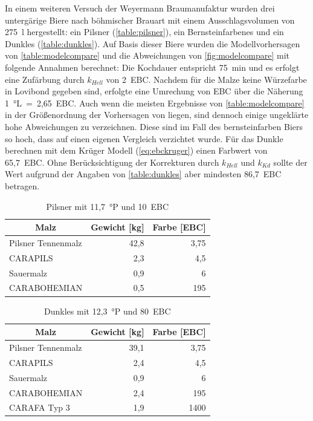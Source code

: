 \documentclass[a4paper,parskip=half]{scrartcl}
\newcommand{\khell}{k_{Hell}}
\newcommand{\kkd}{k_{Kd}}
\begin{document}
In einem weiteren Versuch der Weyermann Braumanufaktur wurden drei untergärige Biere nach böhmischer Brauart mit einem Ausschlagsvolumen von 275~l hergestellt: ein Pilsner (\autoref{table:pilsner}), ein Bernsteinfarbenes und ein Dunkles (\autoref{table:dunkles}). Auf Basis dieser Biere wurden die Modellvorhersagen von \autoref{table:modelcompare} und die Abweichungen von \autoref{fig:modelcompare} mit folgende Annahmen berechnet: Die Kochdauer entspricht 75~min und es erfolgt eine Zufärbung durch $\khell$ von 2~EBC. Nachdem für die Malze keine Würzefarbe in Lovibond gegeben sind, erfolgte eine Umrechung von EBC über die Näherung 1~°L~=~2,65~EBC. Auch wenn die meisten Ergebnisse von \autoref{table:modelcompare} in der Größenordnung der Vorhersagen von \textcite{KrausWeyermann2022} liegen, sind dennoch einige ungeklärte hohe Abweichungen zu verzeichnen. Diese sind im Fall des bernsteinfarben Biers so hoch, dass auf einen eigenen Vergleich verzichtet wurde. Für das Dunkle berechnen \textcite{KrausWeyermann2022} mit dem Krüger Modell (\autoref{eq:ebckruger}) einen Farbwert von 65,7~EBC. Ohne Berücksichtigung der Korrekturen durch $\khell$ und $\kkd$ sollte der Wert aufgrund der Angaben von \autoref{table:dunkles} aber mindesten 86,7~EBC betragen.

\begin{table}[H]
\centering
\begin{tabular}{lrr}
\toprule
\multicolumn{1}{c}{\textbf{Malz}} & \multicolumn{1}{c}{\textbf{Gewicht [kg]}} & \multicolumn{1}{c}{\textbf{Farbe [EBC]}} \\
\midrule
Pilsner Tennenmalz & 42,8 & 3,75 \\
CARAPILS & 2,3 & 4,5 \\
Sauermalz & 0,9 & 6 \\
CARABOHEMIAN & 0,5 & 195 \\
\bottomrule
\end{tabular}
\caption{Pilsner mit 11,7~°P und 10~EBC \parencite{KrausWeyermann2022}}
\label{table:pilsner}
\end{table}

\begin{table}[H]
\centering
\begin{tabular}{lrr}
\toprule
\multicolumn{1}{c}{\textbf{Malz}} & \multicolumn{1}{c}{\textbf{Gewicht [kg]}} & \multicolumn{1}{c}{\textbf{Farbe [EBC]}} \\
\midrule
Pilsner Tennenmalz & 39,1 & 3,75 \\
CARAPILS & 2,4 & 4,5 \\
Sauermalz & 0,9 & 6 \\
CARABOHEMIAN & 2,4 & 195 \\
CARAFA Typ 3 & 1,9 & 1400 \\
\bottomrule
\end{tabular}
\caption{Dunkles mit 12,3~°P und 80~EBC \parencite{KrausWeyermann2022}}
\label{table:dunkles}
\end{table}
\end{document}
